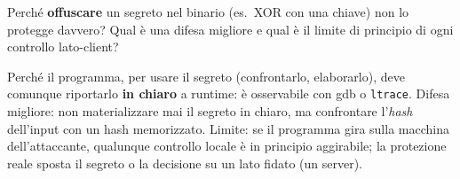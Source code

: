 \question[5]
Perché \textbf{offuscare} un segreto nel binario (es.\ XOR con una chiave) non lo protegge davvero?
Qual è una difesa migliore e qual è il limite di principio di ogni controllo lato-client?
\begin{solution}
Perché il programma, per usare il segreto (confrontarlo, elaborarlo), deve comunque riportarlo \textbf{in chiaro} a runtime: è osservabile con gdb o \lstinline|ltrace|.
Difesa migliore: non materializzare mai il segreto in chiaro, ma confrontare l'\emph{hash} dell'input con un hash memorizzato.
Limite: se il programma gira sulla macchina dell'attaccante, qualunque controllo locale è in principio aggirabile; la protezione reale sposta il segreto o la decisione su un lato fidato (un server).
\end{solution}
